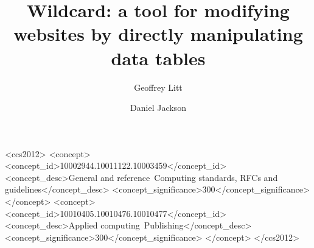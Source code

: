 \documentclass[english,submission]{programming}
\begin{document}
\title{Wildcard: a tool for modifying websites by directly manipulating
data tables}
\subtitle{}%

\author{Geoffrey Litt}
\author{Daniel Jackson}





\begin{CCSXML}
<ccs2012>
<concept>
<concept_id>10002944.10011122.10003459</concept_id>
<concept_desc>General and reference~Computing standards, RFCs and guidelines</concept_desc>
<concept_significance>300</concept_significance>
</concept>
<concept>
<concept_id>10010405.10010476.10010477</concept_id>
<concept_desc>Applied computing~Publishing</concept_desc>
<concept_significance>300</concept_significance>
</concept>
</ccs2012>
\end{CCSXML}



\maketitle
\end{document}
